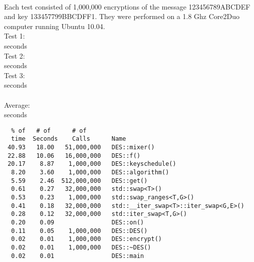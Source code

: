 \documentclass[10pt]{article}
\begin{document}
\paragraph{}Each test consisted of 1,000,000 encryptions of the message 123456789ABCDEF and key 133457799BBCDFF1. They were performed on a 1.8 Ghz Core2Duo computer running Ubuntu 10.04.
\\Test 1:
\\  seconds
\\Test 2:
\\  seconds
\\Test 3:
\\  seconds
\\\\Average:
\\  seconds
\begin{verbatim}
  % of   # of      # of
  time  Seconds    Calls      Name
 40.93   18.00   51,000,000   DES::mixer()
 22.88   10.06   16,000,000   DES::f()
 20.17    8.87    1,000,000   DES::keyschedule()
  8.20    3.60    1,000,000   DES::algorithm()
  5.59    2.46  512,000,000   DES::get()
  0.61    0.27   32,000,000   std::swap<T>()
  0.53    0.23    1,000,000   std::swap_ranges<T,G>()
  0.41    0.18   32,000,000   std::__iter_swap<T>::iter_swap<G,E>()
  0.28    0.12   32,000,000   std::iter_swap<T,G>()
  0.20    0.09                DES::on()
  0.11    0.05    1,000,000   DES::DES()
  0.02    0.01    1,000,000   DES::encrypt()
  0.02    0.01    1,000,000   DES::~DES()
  0.02    0.01                DES::main
\end{verbatim}
\end{document}
